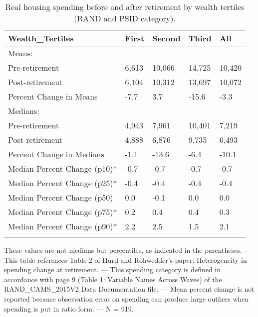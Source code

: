 \begin{table}[tbp] \centering
{}

\caption{Real housing spending before and after retirement by wealth tertiles (RAND and PSID category).}
\begin{tabularx}{\textwidth}{lCCCC}

\toprule
{Wealth\_Tertiles}&{First}&{Second}&{Third}&{All} \tabularnewline
\midrule\addlinespace[1.5ex]
Means:&&&& \tabularnewline
\midrule Pre-retirement&6,613&10,066&14,725&10,420 \tabularnewline
Post-retirement&6,104&10,312&13,697&10,072 \tabularnewline
Percent Change in Means&-7.7&3.7&-15.6&-3.3 \tabularnewline
\midrule Medians:&&&& \tabularnewline
\midrule Pre-retirement&4,943&7,961&10,401&7,219 \tabularnewline
Post-retirement&4,888&6,876&9,735&6,493 \tabularnewline
Percent Change in Medians&-1.1&-13.6&-6.4&-10.1 \tabularnewline
Median Percent Change (p10)*&-0.7&-0.7&-0.7&-0.7 \tabularnewline
Median Percent Change (p25)*&-0.4&-0.4&-0.4&-0.4 \tabularnewline
Median Percent Change (p50)&0.0&-0.1&0.0&0.0 \tabularnewline
Median Percent Change (p75)*&0.2&0.4&0.4&0.3 \tabularnewline
Median Percent Change (p90)*&2.2&2.5&1.5&2.1 \tabularnewline
\bottomrule \addlinespace[1.5ex]

\end{tabularx}
\begin{flushleft}
\footnotesize *These values are not medians but percentiles, as indicated in the parentheses. \linebreak --- \linebreak This table references Table 2 of Hurd and Rohwedder's paper: Heterogeneity in spending change at retirement. \linebreak --- \linebreak This spending category is defined in accordance with page 9 (Table 1: Variable Names Across Waves) of the RAND\_CAMS\_2015V2 Data Documentation file. \linebreak --- \linebreak Mean percent change is not reported because observation error on spending can produce large outliers when spending is put in ratio form. \linebreak --- \linebreak N = 919.
\end{flushleft}
\end{table}
